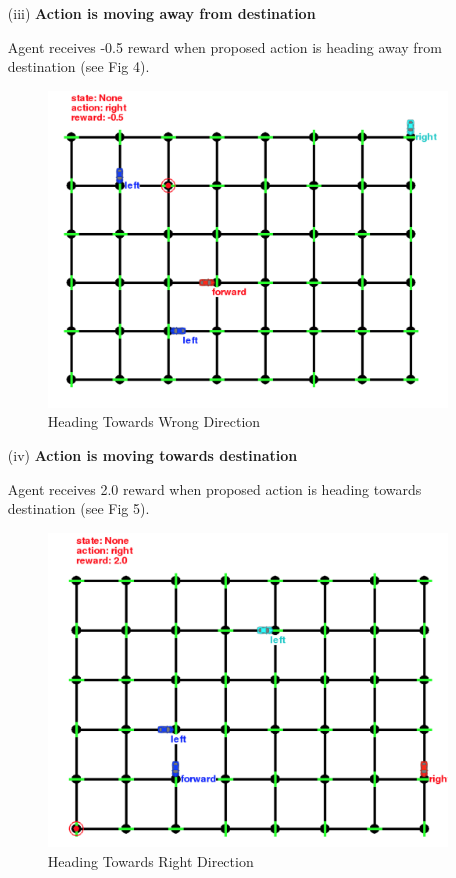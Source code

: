 \documentclass[12pt,a4paper]{article}
\begin{document}
\begin{enumerate}
\item[(iii)]
\textbf{Action is moving away from destination}

Agent receives -0.5 reward when proposed action is heading away from destination (see Fig 4).
\begin{figure}[H]
\caption{Heading Towards Wrong Direction}
\includegraphics[width=12cm]{fig4.png}
\centering
\end{figure}

\item[(iv)]
\textbf{Action is moving towards destination}

Agent receives 2.0 reward when proposed action is heading towards destination (see Fig 5).
\begin{figure}[H]
\caption{Heading Towards Right Direction}
\includegraphics[width=12cm]{fig5.png}
\centering
\end{figure}

\end{enumerate}
\end{document}

